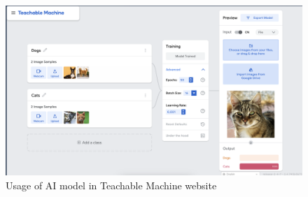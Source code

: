 \documentclass{article}
\begin{document}
\begin{figure}[h]
    \centering
    \includegraphics[width=\textwidth,keepaspectratio]{images/TeachableMachineExample.png}
    \caption{Usage of AI model in Teachable Machine website}
    \label{fig:appendix_image2}
\end{figure}
\end{document}
